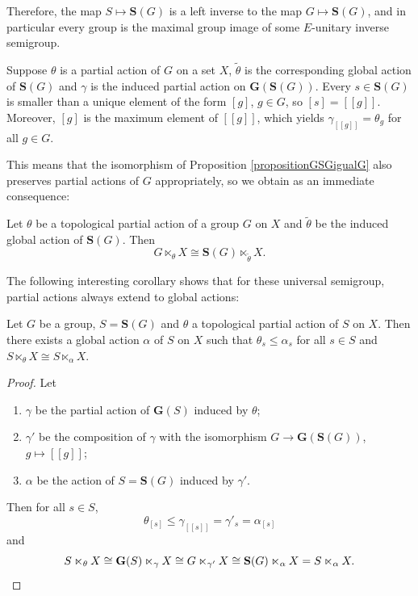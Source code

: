 Therefore, the map $S\mapsto\mathbf{S}(G)$ is a left inverse to the map $G\mapsto\mathbf{S}(G)$, and in particular every group is the maximal group image of some $E$-unitary inverse semigroup.%

Suppose $\theta$ is a partial action of $G$ on a set $X$, $\widetilde{\theta}$ is the corresponding global action of $\mathbf{S}(G)$ and $\gamma$ is the induced partial action on $\mathbf{G}(\mathbf{S}(G))$. Every $s\in\mathbf{S}(G)$ is smaller than a unique element of the form $[g]$, $g\in G$, so $[s]=[[g]]$. Moreover, $[g]$ is the maximum element of $[[g]]$, which yields $\gamma_{[[g]]}=\theta_g$ for all $g\in G$.

This means that the isomorphism of Proposition \ref{propositionGSGigualG} also preserves partial actions of $G$ appropriately, so we obtain as an immediate consequence:

\begin{corollary}
Let $\theta$ be a topological partial action of a group $G$ on $X$ and $\widetilde{\theta}$ be the induced global action of $\mathbf{S}(G)$. Then
\[G\ltimes_\theta X \cong \mathbf{S}(G)\ltimes_{\widetilde{\theta}} X.\]
\end{corollary}

The following interesting corollary shows that for these universal semigroup, partial actions always extend to global actions:

\begin{corollary}
Let $G$ be a group, $S=\mathbf{S}(G)$ and $\theta$ a topological partial action of $S$ on $X$. Then there exists a global action $\alpha$ of $S$ on $X$ such that $\theta_s\leq\alpha_s$ for all $s\in S$ and $S\ltimes_\theta X\cong S\ltimes_\alpha X$.
\end{corollary}
\begin{proof}
Let
\begin{enumerate}
\item $\gamma$ be the partial action of $\mathbf{G}(S)$ induced by $\theta$;
\item $\gamma'$ be the composition of $\gamma$ with the isomorphism $G\to\mathbf{G}(\mathbf{S}(G))$, $g\mapsto [[g]]$;
\item $\alpha$ be the action of $S=\mathbf{S}(G)$ induced by $\gamma'$.
\end{enumerate}
Then for all $s\in S$,
\[\theta_{[s]}\leq\gamma_{[[s]]}=\gamma'_{s}=\alpha_{[s]}\]
and
\[S\ltimes_\theta X\cong \mathbf{G}(S)\ltimes_{\gamma} X\cong G\ltimes_{\gamma'}X\cong \mathbf{S}(G)\ltimes_\alpha X= S\ltimes_\alpha X.\qedhere\]
\end{proof}